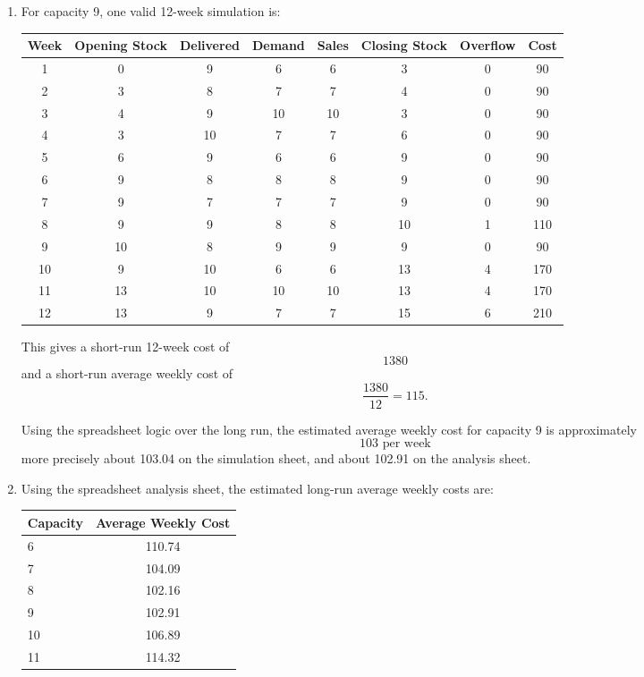 \documentclass[11pt,a4paper]{article}
\begin{document}
\begin{enumerate}
\item For capacity 9, one valid 12-week simulation is:

\begin{center}
\begin{tabular}{cccccccc}
\toprule
Week & Opening Stock & Delivered & Demand & Sales & Closing Stock & Overflow & Cost \\
\midrule
1 & 0 & 9 & 6 & 6 & 3 & 0 & 90 \\
2 & 3 & 8 & 7 & 7 & 4 & 0 & 90 \\
3 & 4 & 9 & 10 & 10 & 3 & 0 & 90 \\
4 & 3 & 10 & 7 & 7 & 6 & 0 & 90 \\
5 & 6 & 9 & 6 & 6 & 9 & 0 & 90 \\
6 & 9 & 8 & 8 & 8 & 9 & 0 & 90 \\
7 & 9 & 7 & 7 & 7 & 9 & 0 & 90 \\
8 & 9 & 9 & 8 & 8 & 10 & 1 & 110 \\
9 & 10 & 8 & 9 & 9 & 9 & 0 & 90 \\
10 & 9 & 10 & 6 & 6 & 13 & 4 & 170 \\
11 & 13 & 10 & 10 & 10 & 13 & 4 & 170 \\
12 & 13 & 9 & 7 & 7 & 15 & 6 & 210 \\
\bottomrule
\end{tabular}
\end{center}

This gives a short-run 12-week cost of
\[
1380
\]
and a short-run average weekly cost of
\[
\frac{1380}{12}=115.
\]

Using the spreadsheet logic over the long run, the estimated average weekly cost for capacity 9 is approximately
\[
103 \text{ per week}
\]
more precisely about 103.04 on the simulation sheet, and about 102.91 on the analysis sheet.

\item Using the spreadsheet analysis sheet, the estimated long-run average weekly costs are:

\begin{center}
\begin{tabular}{lc}
\toprule
Capacity & Average Weekly Cost \\
\midrule
6 & 110.74 \\
7 & 104.09 \\
8 & 102.16 \\
9 & 102.91 \\
10 & 106.89 \\
11 & 114.32 \\
\bottomrule
\end{tabular}
\end{center}


\end{enumerate}
\end{document}
